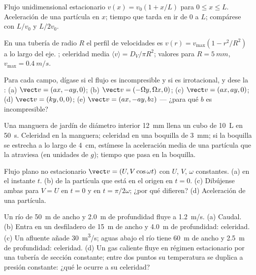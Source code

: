 \begin{exercise}[$\star$]\label{exo:b2:fluid-kinematics:2}
Flujo unidimensional estacionario $v(x) = v_0(1 + x/L)$ para $0 \le x \le L$.
Aceleración de una partícula en $x$; tiempo que tarda en ir de $0$ a
$L$; compárese con $L/v_0$ y $L/2v_0$.
\end{exercise}

\begin{exercise}[$\star$]\label{exo:b2:fluid-kinematics:3}
En una tubería de radio $R$ el perfil de velocidades es $v(r) = v_{\max}(1 -
r^2/R^2)$ a lo largo del eje. ; celeridad media $\langle v\rangle
= D_V/\pi R^2$; valores para $R = \qty{5}{mm}$, $v_{\max} = \qty{0.4}{m/s}$.
\end{exercise}

\begin{exercise}[$\star$]\label{exo:b2:fluid-kinematics:4}
Para cada campo, dígase si el flujo es incompresible y si es irrotacional,
y dese la : (a) $\vect v = (ax, -ay, 0)$; (b)
$\vect v = (-\Omega y, \Omega x, 0)$; (c) $\vect v = (ax, ay, 0)$; (d) $\vect v =
(ky, 0, 0)$; (e) $\vect v = (ax, -ay, bz)$ --- ¿para qué $b$ es
incompresible?
\end{exercise}

\begin{exercise}[$\star\star$]\label{exo:b2:fluid-kinematics:5}
Una manguera de jardín de diámetro interior \qty{12}{mm} llena un cubo de
\qty{10}{L} en \qty{50}{s}. Celeridad en la manguera; celeridad en una
boquilla de \qty{3}{mm}; si la boquilla se estrecha a lo largo de
\qty{4}{cm}, estímese la aceleración media de una partícula que la
atraviesa (en unidades de $g$); tiempo que pasa en la boquilla.
\end{exercise}

\begin{exercise}[$\star\star$]\label{exo:b2:fluid-kinematics:6}
Flujo plano no estacionario $\vect v = (U, V\cos\omega t)$ con $U$, $V$, $\omega$
constantes. (a)  en el instante $t$. (b)  de
la partícula que está en el origen en $t = 0$. (c) Dibújense ambas para
$V = U$ en $t = 0$ y en $t = \pi/2\omega$; ¿por qué difieren? (d) Aceleración de una partícula.
\end{exercise}

\begin{exercise}[$\star\star$]\label{exo:b2:fluid-kinematics:7}
Un río de \qty{50}{m} de ancho y \qty{2.0}{m} de profundidad fluye a
\qty{1.2}{m/s}. (a) Caudal. (b) Entra en un desfiladero de \qty{15}{m} de
ancho y \qty{4.0}{m} de profundidad: celeridad. (c) Un afluente añade
\qty{30}{m^3/s}; aguas abajo el río tiene \qty{60}{m} de ancho y
\qty{2.5}{m} de profundidad: celeridad. (d) Un gas caliente fluye en
régimen estacionario por una tubería de sección constante; entre dos
puntos su temperatura se duplica a presión constante: ¿qué le ocurre a su celeridad?
\end{exercise}

